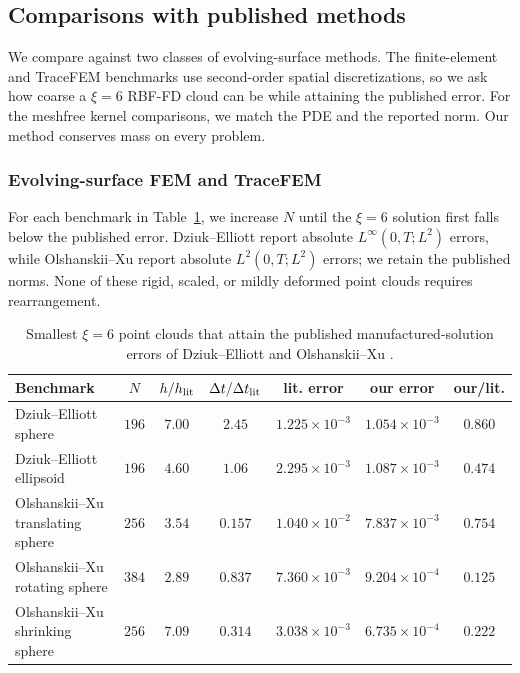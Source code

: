 \documentclass[a4paper,fleqn]{cas-sc}
\begin{document}
\subsection{Comparisons with published methods}
\label{subsec:literature-comparisons}
We compare against two classes of evolving-surface methods.  The finite-element
and TraceFEM benchmarks use second-order spatial discretizations, so we ask how
coarse a \(\xi=6\) RBF-FD cloud can be while attaining the published error.
For the meshfree kernel comparisons, we match the PDE and the reported norm. Our method conserves mass on every problem.

\subsubsection{Evolving-surface FEM and TraceFEM}
\label{subsubsec:fem-literature-comparisons}

For each benchmark in Table~\ref{tab:literature-thresholds}, we increase \(N\)
until the \(\xi=6\) solution first falls below the published error.
Dziuk--Elliott \cite{DziukElliott2007EvolvingSurfaces} report absolute
\(L^\infty(0,T;L^2)\) errors, while Olshanskii--Xu
\cite{OlshanskiiXu2017TraceFEM} report absolute
\(L^2(0,T;L^2)\) errors; we retain the published norms.  None of these rigid,
scaled, or mildly deformed point clouds requires rearrangement.

\begin{table}[t]
\centering
\caption{Smallest \(\xi=6\) point clouds that attain the published
manufactured-solution errors of Dziuk--Elliott
\cite{DziukElliott2007EvolvingSurfaces} and Olshanskii--Xu
\cite{OlshanskiiXu2017TraceFEM}.}
\scriptsize
\setlength{\tabcolsep}{3pt}
\label{tab:literature-thresholds}
\begin{tabular}{l c c c c c c}
\toprule
Benchmark & \(N\) & \(h/h_{\rm lit}\) &
\(\Delta t/\Delta t_{\rm lit}\) &
lit. error & our error & our/lit. \\
\midrule
Dziuk--Elliott sphere & \(196\) & \(7.00\) & \(2.45\) &
\(1.225{\times}10^{-3}\) & \(1.054{\times}10^{-3}\) & \(0.860\) \\
Dziuk--Elliott ellipsoid & \(196\) & \(4.60\) & \(1.06\) &
\(2.295{\times}10^{-3}\) & \(1.087{\times}10^{-3}\) & \(0.474\) \\
Olshanskii--Xu translating sphere & \(256\) & \(3.54\) & \(0.157\) &
\(1.040{\times}10^{-2}\) & \(7.837{\times}10^{-3}\) & \(0.754\) \\
Olshanskii--Xu rotating sphere & \(384\) & \(2.89\) & \(0.837\) &
\(7.360{\times}10^{-3}\) & \(9.204{\times}10^{-4}\) & \(0.125\) \\
Olshanskii--Xu shrinking sphere & \(256\) & \(7.09\) & \(0.314\) &
\(3.038{\times}10^{-3}\) & \(6.735{\times}10^{-4}\) & \(0.222\) \\
\bottomrule
\end{tabular}
\end{table}
\end{document}

